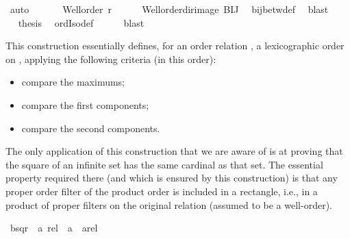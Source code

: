 \begin{isabellebody}
\ auto\isanewline
\ \ \ \isamarkupfalse%
\ \isamarkupfalse%
\ {\isachardoublequoteopen}Well{\isacharunderscore}{\kern0pt}order\ {\isacharquery}{\kern0pt}r{\isacharprime}{\kern0pt}{\isachardoublequoteclose}\isanewline
\ \ \ \isamarkupfalse%
\ {}\ Well{\isacharunderscore}{\kern0pt}order{\isacharunderscore}{\kern0pt}dir{\isacharunderscore}{\kern0pt}image\ BIJ\ \isamarkupfalse%
\ bij{\isacharunderscore}{\kern0pt}betw{\isacharunderscore}{\kern0pt}def\ \isamarkupfalse%
\ blast\isanewline
\ \ \ \isamarkupfalse%
\ \isamarkupfalse%
\ {\isacharquery}{\kern0pt}thesis\ \isamarkupfalse%
\ ordIso{\isacharunderscore}{\kern0pt}def\ \isamarkupfalse%
\ {}\ {}\ \isamarkupfalse%
\ blast\isanewline
{}\isamarkupfalse%
%
\endisatagproof
{\isafoldproof}%
%
\isadelimproof
%
\endisadelimproof
%
\isadelimdocument
%
\endisadelimdocument
%
\isatagdocument
%
\isamarkuptrue%
%
\endisatagdocument
{\isafolddocument}%
%
\isadelimdocument
%
\endisadelimdocument
%
\begin{isamarkuptext}%
This construction essentially defines, for an order relation , a lexicographic
order  on , applying the
following criteria (in this order):
\begin{itemize}
\item compare the maximums;
\item compare the first components;
\item compare the second components.
\end{itemize}
%
The only application of this construction that we are aware of is
at proving that the square of an infinite set has the same cardinal
as that set. The essential property required there (and which is ensured by this
construction) is that any proper order filter of the product order is included in a rectangle, i.e.,
in a product of proper filters on the original relation (assumed to be a well-order).%
\end{isamarkuptext}\isamarkuptrue%
\isamarkupfalse%
\ bsqr\ {\isacharcolon}{\kern0pt}{\isacharcolon}{\kern0pt}\ {\isachardoublequoteopen}{\isacharprime}{\kern0pt}a\ rel\ {\isacharequal}{\kern0pt}{\isachargreater}{\kern0pt}\ {\isacharparenleft}{\kern0pt}{\isacharprime}{\kern0pt}a\ {\isacharasterisk}{\kern0pt}\ {\isacharprime}{\kern0pt}a{\isacharparenright}{\kern0pt}rel{\isachardoublequoteclose}\isanewline

\end{isabellebody}

